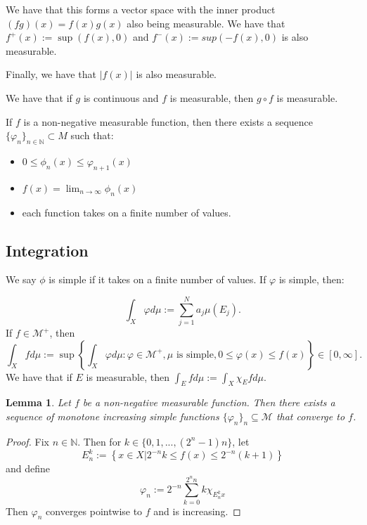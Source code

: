 \documentclass{article}
\newtheorem{lemma}[theorem]{Lemma}
\theoremstyle{definition}
\numberwithin{theorem}{section}
\numberwithin{equation}{section}
\begin{document}
We have that this forms a vector space with the inner product $(fg)(x) = f(x)g(x)$ also being measurable. We have that $f^+(x) := \sup(f(x), 0)$ and $f^-(x) := sup(-f(x), 0)$ is also measurable. 

Finally, we have that $|f(x)| $ is also measurable. 

We have that if $g$ is continuous and $f$ is measurable, then $g \circ f$ is measurable. 

If $f$ is a non-negative measurable function, then there exists a sequence $\lbrace \varphi_n \rbrace_{n \in \mathbb{N}} \subset M$ such that:
\begin{itemize}
	\item $0 \leq \phi_n(x) \leq \varphi_{n+1}(x)$
	\item $f(x) = \lim_{n \rightarrow \infty} \phi_n(x)$
	\item each function takes on a finite number of values. 
\end{itemize}
\subsection{Integration}
We say $\phi$ is simple if it takes on a finite number of values. If $\varphi$ is simple, then:

\begin{equation}
	\int_X \varphi d\mu := \sum_{j = 1}^N a_j \mu(E_j).
\end{equation}
If $f \in \mathcal{M}^+$, then \begin{equation}
	\int_X f d\mu := \sup \left \lbrace \int_X \varphi d\mu: \varphi \in \mathcal{M}^+, \mu \text{ is simple}, 0 \leq \varphi(x) \leq f(x) \right\rbrace \in [0, \infty].
\end{equation}
We have that if $E$ is measurable, then $\int_E f d\mu := \int_X \chi_E f d\mu$. 

\begin{lemma}
	Let $f$ be a non-negative measurable function. Then there exists a sequence of monotone increasing simple functions $\{ \varphi_n\}_n \subseteq \mathcal{M}$ that converge to $f$.
\end{lemma}
\begin{proof}
	Fix $n \in \mathbb{N}$. Then for $k \in \{0, 1, ..., (2^n - 1) n\}$, let
	\begin{equation}
		E_n^k := \left\{
		x \in X| 2^{-n} k \leq f(x) \leq 2^{-n}(k + 1)
		\right\}
	\end{equation}
	and define
	\begin{equation}
		\varphi_n := 2^{-n} \sum_{k = 0}^{2^n n} k \chi_{ E_n^k x}
	\end{equation}
	Then $\varphi_n$ converges pointwise to $f$ and is increasing. 
\end{proof}
\end{document}

